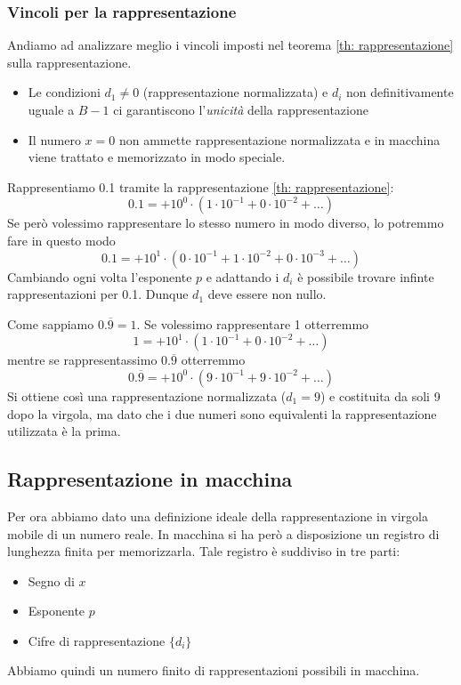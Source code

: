 \subsubsection{Vincoli per la rappresentazione}
Andiamo ad analizzare meglio i vincoli imposti nel teorema \ref{th: rappresentazione} sulla rappresentazione.
\begin{itemize}
	\item Le condizioni $d_1 \neq 0$ (rappresentazione normalizzata) e $d_i$ non definitivamente uguale a
	      $B - 1$ ci garantiscono l'\emph{unicità} della rappresentazione
	\item Il numero $x = 0$ non ammette rappresentazione normalizzata e in macchina viene trattato e
	      memorizzato in modo speciale.
\end{itemize}

\begin{example}
	Rappresentiamo 0.1 tramite la rappresentazione \ref{th: rappresentazione}:
	\[ 0.1 = + 10^0 \cdot (1 \cdot 10^{-1} + 0 \cdot 10^{-2} + \dots) \]
	Se però volessimo rappresentare lo stesso numero in modo diverso, lo potremmo fare in questo modo
	\[ 0.1 = + 10^1 \cdot (0 \cdot 10^{-1} + 1 \cdot 10^{-2} + 0 \cdot 10^{-3} + \dots) \]
	Cambiando ogni volta l'esponente $p$ e adattando i $d_i$ è possibile trovare infinte rappresentazioni
	per 0.1. Dunque $d_1$ deve essere non nullo.
\end{example}

\begin{example}
	Come sappiamo $0.\overline{9} = 1$. Se volessimo rappresentare 1 otterremmo
	\[ 1 = + 10^1 \cdot (1 \cdot 10^{-1} + 0 \cdot 10^{-2} + \dots) \]
	mentre se rappresentassimo $0.\overline{9}$ otterremmo
	\[ 0.\overline{9} = + 10^0 \cdot (9 \cdot 10^{-1} + 9 \cdot 10^{-2} + \dots) \]
	Si ottiene così una rappresentazione normalizzata ($d_1 = 9$) e costituita da soli 9 dopo la virgola,
	ma dato che i due numeri sono equivalenti la rappresentazione utilizzata è la prima.
\end{example}

\subsection{Rappresentazione in macchina}
Per ora abbiamo dato una definizione ideale della rappresentazione in virgola mobile di un numero reale.
In macchina si ha però a disposizione un registro di lunghezza finita per memorizzarla. Tale registro è
suddiviso in tre parti:
\begin{itemize}
	\item Segno di $x$
	\item Esponente $p$
	\item Cifre di rappresentazione $\{ d_i \}$
\end{itemize}
Abbiamo quindi un numero finito di rappresentazioni possibili in macchina.

